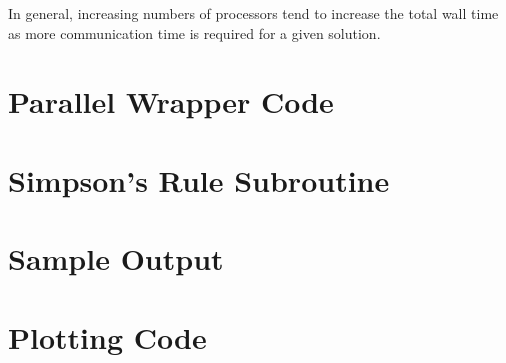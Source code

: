 \documentclass[twocolumn,10pt]{asme2ej}
\begin{document}
In general, increasing numbers of processors tend to increase the total wall time as more communication time is required for a given solution.


\section*{Parallel Wrapper Code}


\section*{Simpson's Rule Subroutine}



\section*{Sample Output}




\clearpage
\section*{Plotting Code}

\end{document}

